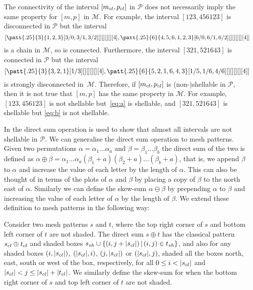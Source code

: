 \documentclass[11pt,a4paper,oneside]{article}
\begin{document}
The connectivity of the interval $[m_{cl},p_{cl}]$ in $\mathcal{P}$ does not
necessarily imply the same property for $[m,p]$ in $\mathcal{M}$. For example,
the interval $[123,456123]$ is disconnected in $\mathcal{P}$ but the interval
\begin{equation}\label{eq:a}\left[\patt{.25}{3}{1,2,3}[3/0,3/1,3/2][][][][][4]
,\patt{.25}{6}{4,5,6,1,2,3}[6/0,6/1,6/2][][][][][4]\right]\end{equation} 
is a chain in $\mathcal{M}$, so is connected. Furthermore, the interval
$[321,521643]$ is connected in $\mathcal{P}$ but the interval
\begin{equation}\label{eq:b}\left[\patt{.25}{3}{3,2,1}[1/3][][][][][4],
\patt{.25}{6}{5,2,1,6,4,3}[1/5,1/6,4/6][][][][][4]\right]\end{equation}
is strongly disconnected in~$\mathcal{M}$. Therefore, if $[m_{cl},p_{cl}]$
is (non-)shellable in $\mathcal{P}$, then it is not true that $[m,p]$ has
the same property in $\mathcal{M}$. For example, $[123,456123]$ is not
shellable but~\eqref{eq:a} is shellable, and $[321,521643]$ is shellable
but \eqref{eq:b} is not shellable.

In \cite{McSt13} the direct sum operation is used to show that almost all
intervals are not shellable in $\mathcal{P}$. We can generalise the direct sum operation to
mesh patterns. Given two permutations $\alpha=\alpha_1\ldots\alpha_a$ and
$\beta=\beta_1\ldots\beta_b$ the direct sum of the two is defined as
$\alpha\oplus\beta=\alpha_1\ldots\alpha_a(\beta_1+a)(\beta_2+a)\ldots(\beta_b+a)$,
that is, we append $\beta$ to $\alpha$ and increase the value of each letter by the
length of $\alpha$. This can also be thought of in terms of the plots of $\alpha$
and $\beta$ by placing a copy of $\beta$ to the north east of $\alpha$.
Similarly we can define the skew-sum $\alpha\ominus\beta$ by
prepending $\alpha$ to $\beta$ and increasing the value of each letter of $\alpha$
by the length of $\beta$. We extend these definition to mesh patterns in the following way:

\begin{defn}\label{defn:directsum}
Consider two mesh patterns $s$ and $t$, where the top right corner of $s$
and bottom left corner of $t$ are not shaded. The direct sum $s\oplus t$ has the classical pattern
$s_{cl}\oplus t_{cl}$ and shaded boxes $s_{sh}\cup\{(i,j+|s_{cl}|)\,|\,(i,j)\in t_{sh}\}$,
and also for any shaded boxes $(i,|s_{cl}|)$, $(|s_{cl}|,i)$, $(j,|s_{cl}|)$ or $(|s_{cl}|,j)$,
shaded all the boxes north, east, south or west of the box, respectively,
for all $0\le i< |s_{cl}|$ and $|s_{cl}|< j\le |s_{cl}|+|t_{cl}|$.  We similarly
define the skew-sum for when the bottom right corner of $s$ and top left corner of $t$ are not shaded.
\end{defn}
\end{document}

